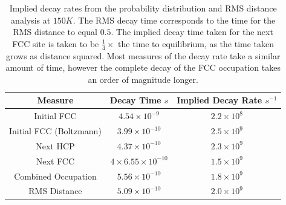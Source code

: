 \begin{table}[htbp]
    \begin{center}
        \begin{tabular}{ *{3}{c} }
            \toprule
            Measure                 & Decay Time \(s\)                   & Implied Decay Rate \(s^{-1}\) \\
            \midrule
            Initial FCC             & \(4.54\times{}10^{-9}\)            & \(2.2\times{}10^{8}\)         \\
            Initial FCC (Boltzmann) & \(3.99\times{}10^{-10}\)           & \(2.5\times{}10^{9}\)         \\
            Next HCP                & \(4.37\times{}10^{-10}\)           & \(2.3\times{}10^{9}\)         \\
            Next FCC                & \(4\times{}6.55 \times{}10^{-10}\) & \(1.5\times{}10^{9}\)         \\
            Combined Occupation     & \(5.56\times{}10^{-10}\)           & \(1.8\times{}10^{9}\)         \\
            RMS Distance            & \(5.09\times{}10^{-10}\)           & \(2.0 \times 10^{9}\)         \\
            \bottomrule
        \end{tabular}
    \end{center}
    \caption{Implied decay rates
        from the probability
        distribution and RMS distance
        analysis at
        \(150K\).
        The RMS decay time corresponds
        to the time for the RMS distance
        to equal \(0.5\).
        The implied decay time taken for
        the next FCC site is taken to
        be \(\frac{1}{4}\times \) the time to
        equilibrium, as the time
        taken grows as distance
        squared.
        Most measures
        of the decay rate take a similar
        amount of time, however the
        complete decay of the FCC
        occupation takes an order of
        magnitude longer.
    }\label{tab:implied decay rates}
\end{table}

